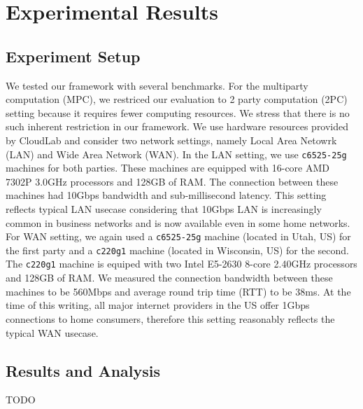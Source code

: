 \section{Experimental Results}
\label{sec:results}

\subsection{Experiment Setup}
We tested our framework with several benchmarks. For the multiparty computation (MPC), we restriced our evaluation to 2 party computation (2PC) setting because it requires fewer computing resources. We stress that there is no such inherent restriction in our framework. We use hardware resources provided by CloudLab\cite{DuplyakinATC19} and consider two network settings, namely Local Area Netowrk (LAN) and Wide Area Network (WAN). In the LAN setting, we use \texttt{c6525-25g} machines for both parties. These machines are equipped with 16-core AMD 7302P 3.0GHz processors and 128GB of RAM. The connection between these machines had 10Gbps bandwidth and sub-millisecond latency. This setting reflects typical LAN usecase considering that 10Gbps LAN is increasingly common in business networks and is now available even in some home networks. For WAN setting, we again used a \texttt{c6525-25g} machine (located in Utah, US) for the first party and a \texttt{c220g1} machine (located in Wisconsin, US) for the second. The \texttt{c220g1} machine is equiped with two Intel E5-2630 8-core 2.40GHz processors and 128GB of RAM. We measured the connection bandwidth between these machines to be 560Mbps and average round trip time (RTT) to be 38ms. At the time of this writing, all major internet providers in the US offer 1Gbps connections to home consumers, therefore this setting reasonably reflects the typical WAN usecase.

\subsection{Results and Analysis}
TODO

